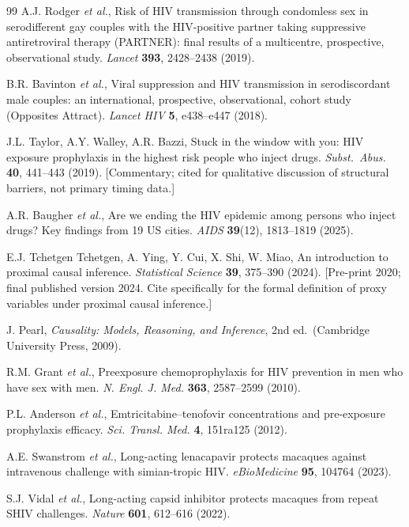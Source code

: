 \documentclass[11pt]{article}
\theoremstyle{definition}
\theoremstyle{remark}
\begin{document}
\begin{thebibliography}{99}
A.J. Rodger \textit{et al.}, Risk of HIV transmission through condomless sex in serodifferent gay couples with the HIV-positive partner taking suppressive antiretroviral therapy (PARTNER): final results of a multicentre, prospective, observational study. \textit{Lancet} \textbf{393}, 2428--2438 (2019).

B.R. Bavinton \textit{et al.}, Viral suppression and HIV transmission in serodiscordant male couples: an international, prospective, observational, cohort study (Opposites Attract). \textit{Lancet HIV} \textbf{5}, e438--e447 (2018).

J.L. Taylor, A.Y. Walley, A.R. Bazzi, Stuck in the window with you: HIV exposure prophylaxis in the highest risk people who inject drugs. \textit{Subst.\ Abus.} \textbf{40}, 441--443 (2019). [Commentary; cited for qualitative discussion of structural barriers, not primary timing data.]

A.R. Baugher \textit{et al.}, Are we ending the HIV epidemic among persons who inject drugs? Key findings from 19 US cities. \textit{AIDS} \textbf{39}(12), 1813--1819 (2025).

E.J. Tchetgen Tchetgen, A. Ying, Y. Cui, X. Shi, W. Miao, An introduction to proximal causal inference. \textit{Statistical Science} \textbf{39}, 375--390 (2024). [Pre-print 2020; final published version 2024. Cite specifically for the formal definition of proxy variables under proximal causal inference.]

J. Pearl, \textit{Causality: Models, Reasoning, and Inference}, 2nd ed.\ (Cambridge University Press, 2009).

R.M. Grant \textit{et al.}, Preexposure chemoprophylaxis for HIV prevention in men who have sex with men. \textit{N. Engl. J. Med.} \textbf{363}, 2587--2599 (2010).

P.L. Anderson \textit{et al.}, Emtricitabine--tenofovir concentrations and pre-exposure prophylaxis efficacy. \textit{Sci. Transl. Med.} \textbf{4}, 151ra125 (2012).

A.E. Swanstrom \textit{et al.}, Long-acting lenacapavir protects macaques against intravenous challenge with simian-tropic HIV. \textit{eBioMedicine} \textbf{95}, 104764 (2023).

S.J. Vidal \textit{et al.}, Long-acting capsid inhibitor protects macaques from repeat SHIV challenges. \textit{Nature} \textbf{601}, 612--616 (2022).


\end{thebibliography}
\end{document}
